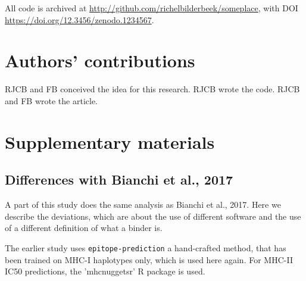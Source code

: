 All code is archived at \url{http://github.com/richelbilderbeek/someplace},
with DOI \url{https://doi.org/12.3456/zenodo.1234567}.

\section{Authors' contributions}

RJCB and FB conceived the idea for this research. 
RJCB wrote the code.
RJCB and FB wrote the article.





\appendix
\section{Supplementary materials}

\subsection{Differences with Bianchi et al., 2017}

A part of this study does the same analysis as Bianchi et al., 2017.
Here we describe the deviations, which are about the use of different
software and the use of a different definition of what a binder is.


The earlier study uses \verb;epitope-prediction; a hand-crafted method, 
that has been trained on MHC-I haplotypes only,
which is used here again. For MHC-II IC50 predictions, the
'mhcnuggetsr' R package is used.

